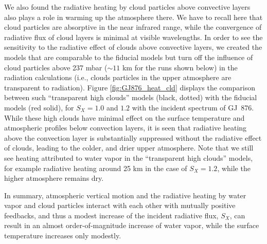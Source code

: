 \documentclass[11pt,numberedappendix,twocolappendix,]{emulateapj}
\def\water{H$_2$O }
\begin{document}
We also found the radiative heating by cloud particles above convective layers also plays a role in warming up the atmosphere there. 
We have to recall here that cloud particles are absorptive in the near infrared range, while the convergence of radiative flux of cloud layers is minimal at visible wavelengths.  
In order to see the sensitivity to the radiative effect of clouds above convective layers, we created the models that are comparable to the fiducial models but turn off the influence of cloud particles above 237 mbar ($\sim 11$ km for the runs shown below) in the radiation calculations (i.e., clouds particles in the upper atmosphere are transparent to radiation). 
Figure \ref{fig:GJ876_heat_cld} displays the comparison between such ``transparent high clouds'' models (black, dotted) with the fiducial models (red solid), for $S_X=1.0$ and $1.2$ with the incident spectrum of GJ~876. 
While these high clouds have minimal effect on the surface temperature and atmospheric profiles below convection layers, it is seen that radiative heating above the convection layer is substantially suppressed without the radiative effect of clouds, leading to the colder, and drier upper atmosphere. 
Note that we still see heating attributed to water vapor in the ``transparent high clouds'' models, for example radiative heating around 25 km in the case of $S_X=1.2$, while the higher atmosphere remains dry. 

In summary, atmospheric vertical motion and the radiative heating by water vapor and cloud particles interact with each other with mutually positive feedbacks, and thus a modest increase of the incident radiative flux, $S_X$, can result in an almost order-of-magnitude increase of water vapor, while the surface temperature increases only modestly. 

\end{document}
